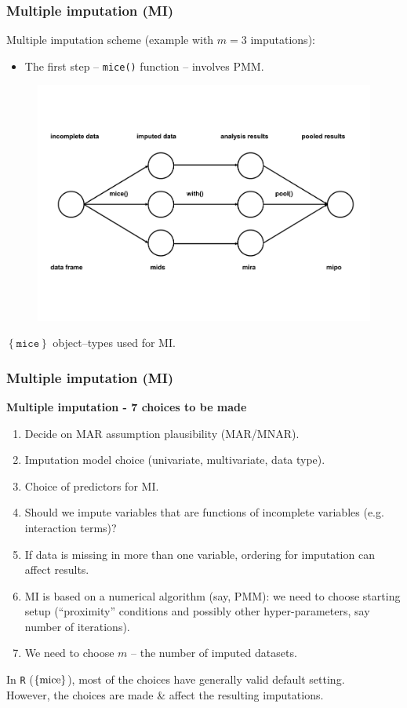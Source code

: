 \documentclass{beamer}
\begin{document}
\begin{frame}
\frametitle{Multiple imputation (MI)}
Multiple imputation scheme (example with $m=3$ imputations):\\
\small
\begin{itemize}
    \item The first step -- \texttt{mice()} function -- involves PMM.
\end{itemize}
\vspace{-1.5cm}
\begin{figure}
\includegraphics[width=1\linewidth]{IMG/mice_scheme.pdf}
\end{figure}
\centering
\vspace{-2.2cm}
$\left\lbrace \texttt{mice}  \right\rbrace$ object--types used for MI.
 \end{frame}
\begin{frame}
\frametitle{Multiple imputation (MI)}
\textbf{Multiple imputation - 7 choices to be made}\\
\smallskip
\begin{enumerate}
    \item Decide on MAR assumption plausibility (MAR/MNAR).
    \item Imputation model choice (univariate, multivariate, data type).
    \item Choice of predictors for MI.
    \item Should we impute variables that are functions of incomplete variables (e.g. interaction terms)?
    \item If data is missing in more than one variable, ordering for imputation can affect results.
    \item MI is based on a numerical algorithm (say, PMM): we need to choose starting setup (``proximity'' conditions and possibly other hyper-parameters, say number of iterations).
    \item We need to choose $m$ -- the number of imputed datasets.
\end{enumerate}
\smallskip
In \texttt{R} ($\{ \textnormal{mice} \}$), most of the choices have generally valid default setting.\\
\smallskip
However, the choices are made \& affect the resulting imputations.
\end{frame}
\end{document}
